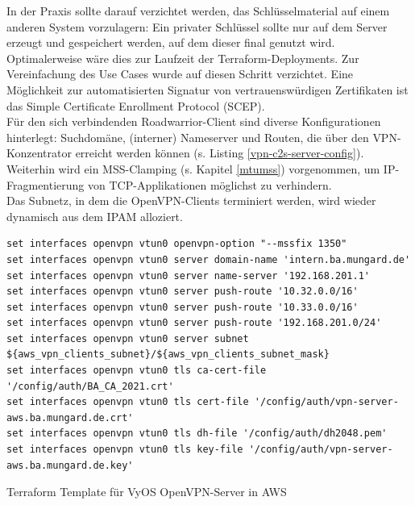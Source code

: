 In der Praxis sollte darauf verzichtet werden, das Schlüsselmaterial \glqq auf einem anderen System vorzulagern\grqq{}: Ein privater Schlüssel sollte nur auf dem Server erzeugt und gespeichert werden, auf dem dieser final genutzt wird. Optimalerweise wäre dies zur Laufzeit der Terraform-\gls{Deployment}s. Zur Vereinfachung des Use Cases wurde auf diesen Schritt verzichtet. Eine Möglichkeit zur automatisierten Signatur von vertrauenswürdigen Zertifikaten ist das Simple Certificate Enrollment Protocol (SCEP)\cite[S.554]{Schmeh2013}.\\
Für den sich verbindenden \gls{Roadwarrior}-\gls{Client} sind diverse Konfigurationen hinterlegt: Suchdomäne, (interner) Nameserver und Routen, die über den \gls{VPN-Konzentrator} erreicht werden können (s. Listing \ref{vpn-c2s-server-config}).
Weiterhin wird ein \gls{MSS}-Clamping (s. Kapitel \ref{mtumss}) vorgenommen, um IP-Fragmen\-tierung von \gls{TCP}-Applikationen möglichst zu verhindern.\\
Das Subnetz, in dem die OpenVPN-\gls{Client}s terminiert werden, wird wieder dynamisch aus dem \gls{IPAM} alloziert.
\begin{listing}[h]
\begin{verbatim}
set interfaces openvpn vtun0 openvpn-option "--mssfix 1350"
set interfaces openvpn vtun0 server domain-name 'intern.ba.mungard.de'
set interfaces openvpn vtun0 server name-server '192.168.201.1'
set interfaces openvpn vtun0 server push-route '10.32.0.0/16'
set interfaces openvpn vtun0 server push-route '10.33.0.0/16'
set interfaces openvpn vtun0 server push-route '192.168.201.0/24'
set interfaces openvpn vtun0 server subnet ${aws_vpn_clients_subnet}/${aws_vpn_clients_subnet_mask}
set interfaces openvpn vtun0 tls ca-cert-file '/config/auth/BA_CA_2021.crt'
set interfaces openvpn vtun0 tls cert-file '/config/auth/vpn-server-aws.ba.mungard.de.crt'
set interfaces openvpn vtun0 tls dh-file '/config/auth/dh2048.pem'
set interfaces openvpn vtun0 tls key-file '/config/auth/vpn-server-aws.ba.mungard.de.key'
\end{verbatim}
\caption{Terraform Template für VyOS OpenVPN-Server in AWS}
\label{vpn-c2s-server-config}
\end{listing}

